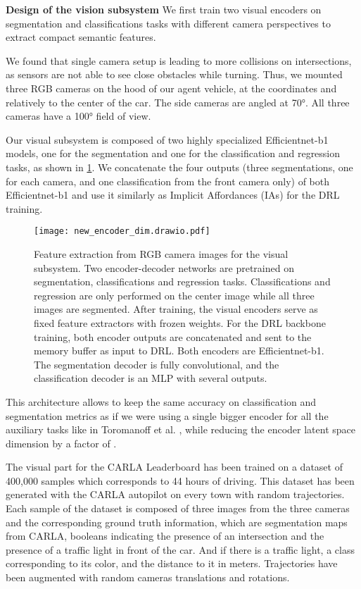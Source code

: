 \documentclass[letterpaper, 10 pt, conference]{ieeeconf}
\begin{document}
\textbf{Design of the vision subsystem} We first train two visual encoders on segmentation and classifications tasks with different camera perspectives to extract compact semantic features.

We found that single camera setup is leading to more collisions on intersections, as sensors are not able to see close obstacles while turning. Thus, we mounted three RGB cameras on the hood of our agent vehicle, at the coordinates  and  relatively to the center of the car. The side cameras are angled at 70°. All three cameras have a 100° field of view. 





Our visual subsystem is composed of two highly specialized Efficientnet-b1 \cite{efficientnet} models, one for the segmentation and one for the classification and regression tasks, as shown in \cref{fig:encoder}. We concatenate the four outputs (three segmentations, one for each camera, and one classification from the front camera only) of both Efficientnet-b1 and use it similarly as Implicit Affordances (IAs) for the DRL training. 

\begin{figure}[h!]
    \centering
    \texttt{[image: new\_encoder\_dim.drawio.pdf]}
    \caption{Feature extraction from RGB camera images for the visual subsystem. Two encoder-decoder networks are pretrained on segmentation, classifications and regression tasks. Classifications and regression are only performed on the center image while all three images are segmented. After training, the visual encoders serve as fixed feature extractors with frozen weights. For the DRL backbone training, both encoder outputs are concatenated and sent to the memory buffer as input to DRL. Both encoders are Efficientnet-b1. The segmentation decoder is fully convolutional, and the classification decoder is an MLP with several outputs.}\label{fig:encoder}
\end{figure}

This architecture allows to keep the same accuracy on classification and segmentation metrics as if we were using a single bigger encoder for all the auxiliary tasks like in Toromanoff et al. \cite{architecture-marin}, while reducing the encoder latent space dimension by a factor of . 




The visual part for the CARLA Leaderboard has been trained on a dataset of 400,000 samples which corresponds to 44 hours of driving. This dataset has been generated with the CARLA autopilot on every town with random trajectories. Each sample of the dataset is composed of three images from the three cameras and the corresponding ground truth information, which are segmentation maps from CARLA, booleans indicating the presence of an intersection and the presence of a traffic light in front of the car. And if there is a traffic light, a class corresponding to its color, and the distance to it in meters. Trajectories have been augmented with random cameras translations and rotations.
\newline 
\end{document}
